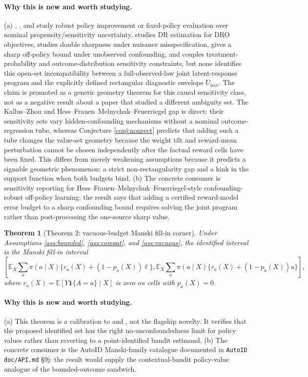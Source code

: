 \documentclass[11pt]{article}
\newcommand{\E}{\mathbb{E}}
\newcommand{\one}{\mathbf{1}}
\theoremstyle{definition}
\theoremstyle{plain}
\newtheorem{theorem}{Theorem}
\theoremstyle{remark}
\begin{document}
\paragraph{Why this is new and worth studying.}
(a) \citet{KallusZhou2018}, \citet{KallusZhou2020}, and \citet{KallusZhou2021} study robust policy improvement or fixed-policy evaluation over nominal propensity/sensitivity uncertainty, \citet{KallusMaoWangZhou2022} studies DR estimation for DRO objectives, \citet{DornGuoKallus2025} studies double sharpness under nuisance misspecification, \citet{HessFrauenMelnychukFeuerriegel2026} gives a sharp off-policy bound under unobserved confounding, and \citet{ZhangXuTan2025} couples treatment-probability and outcome-distribution sensitivity constraints, but none identifies this open-set incompatibility between a full-observed-law joint latent-response program and the explicitly defined rectangular diagnostic envelope $U_{\mathrm{rect}}$. The claim is promoted as a generic geometry theorem for this causal sensitivity class, not as a negative result about a paper that studied a different ambiguity set. The Kallus--Zhou and Hess--Frauen--Melnychuk--Feuerriegel gap is direct: their sensitivity sets vary hidden-confounding mechanisms without a nominal outcome-regression tube, whereas Conjecture \ref{conj:nonrect} predicts that adding such a tube changes the value-set geometry because the weight tilt and reward-mean perturbation cannot be chosen independently after the factual reward cells have been fixed. This differs from merely weakening assumptions because it predicts a signable geometric phenomenon: a strict non-rectangularity gap and a kink in the support function when both budgets bind. (b) The concrete consumer is sensitivity reporting for Hess--Frauen--Melnychuk--Feuerriegel-style confounding-robust off-policy learning: the result says that adding a certified reward-model error budget to a sharp confounding bound requires solving the joint program rather than post-processing the one-source sharp value.

\begin{theorem}[Theorem 2: vacuous-budget Manski fill-in corner]\label{thm:manski-corner}
Under Assumptions \ref{ass:bounded}, \ref{ass:compat}, and \ref{ass:vacuous}, the identified interval is the Manski fill-in interval
\[
  \left[
  \E_X\sum_a\pi(a\mid X)\{r_a(X)+(1-p_a(X))\ell\},
  \E_X\sum_a\pi(a\mid X)\{r_a(X)+(1-p_a(X))u\}
  \right],
\]
where $r_a(X)=\E[Y\one\{A=a\}\mid X]$ is zero on cells with $p_a(X)=0$.
\end{theorem}
\paragraph{Why this is new and worth studying.}
(a) This theorem is a calibration to \citet{Manski1990} and \citet{ManskiPepper2000}, not the flagship novelty. It verifies that the proposed identified set has the right no-unconfoundedness limit for policy values rather than reverting to a point-identified bandit estimand. (b) The concrete consumer is the AutoID Manski-family catalogue documented in \texttt{AutoID} \texttt{doc/API.md} \S9j: the result would supply the contextual-bandit policy-value analogue of the bounded-outcome sandwich.
\end{document}
